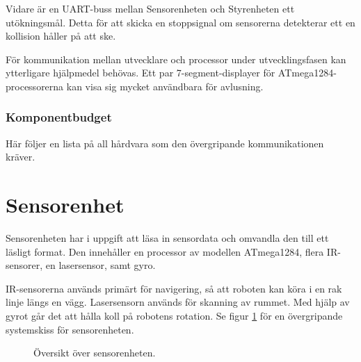 \documentclass[a4paper,11pt]{article}
\begin{document}
Vidare är en UART-buss mellan Sensorenheten och Styrenheten ett utökningsmål. Detta för att skicka en stoppsignal om sensorerna detekterar ett en kollision håller på att ske.

För kommunikation mellan utvecklare och processor under utvecklingsfasen kan ytterligare hjälpmedel behövas. Ett par 7-segment-displayer för ATmega1284-processorerna kan visa sig mycket användbara för avlusning.

\subsubsection{Komponentbudget}
Här följer en lista på all hårdvara som den övergripande kommunikationen kräver.

\begin{center}
\begin{HardwareList}
\end{HardwareList}
\end{center}

\clearpage
\section{Sensorenhet}
Sensorenheten har i uppgift att läsa in sensordata och omvandla den till ett läsligt format. Den innehåller en processor av modellen ATmega1284, flera IR-sensorer, en lasersensor, samt gyro.

IR-sensorerna används primärt för navigering, så att roboten kan köra i en rak linje längs en vägg. Lasersensorn används för skanning av rummet. Med hjälp av gyrot går det att hålla koll på robotens rotation.
Se figur \ref{fig:unitSensor} för en övergripande systemskiss för sensorenheten.

\begin{figure}[h!]
	\caption{Översikt över sensorenheten.}
	\label{fig:unitSensor}
\end{figure}
\end{document}
